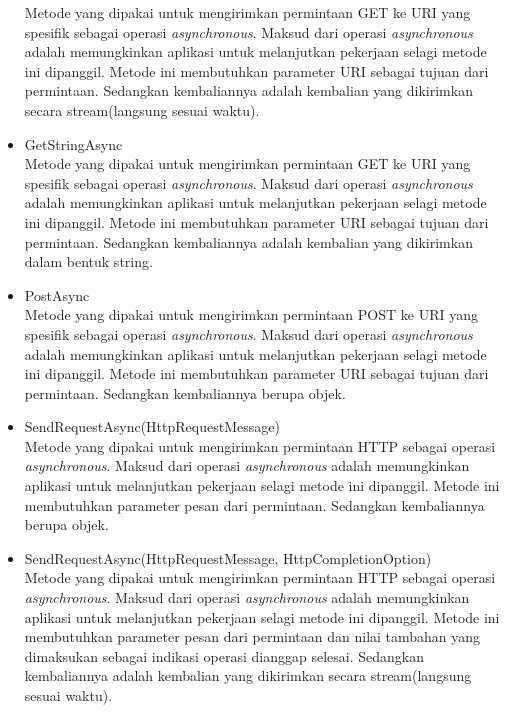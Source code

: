 \begin{itemize}
	Metode yang dipakai untuk mengirimkan permintaan GET ke URI yang spesifik sebagai operasi \textit{asynchronous}. Maksud dari operasi \textit{asynchronous} adalah memungkinkan aplikasi untuk melanjutkan pekerjaan selagi metode ini dipanggil\footnotemark[2]. Metode ini membutuhkan parameter URI sebagai tujuan dari permintaan. Sedangkan kembaliannya adalah kembalian yang dikirimkan secara stream(langsung sesuai waktu).
	\item GetStringAsync \\
	Metode yang dipakai untuk mengirimkan permintaan GET ke URI yang spesifik sebagai operasi \textit{asynchronous}. Maksud dari operasi \textit{asynchronous} adalah memungkinkan aplikasi untuk melanjutkan pekerjaan selagi metode ini dipanggil\footnotemark[2]. Metode ini membutuhkan parameter URI sebagai tujuan dari permintaan. Sedangkan kembaliannya adalah kembalian yang dikirimkan dalam bentuk string.
	\item PostAsync \\
	Metode yang dipakai untuk mengirimkan permintaan POST ke URI yang spesifik sebagai operasi \textit{asynchronous}. Maksud dari operasi \textit{asynchronous} adalah memungkinkan aplikasi untuk melanjutkan pekerjaan selagi metode ini dipanggil\footnotemark[2]. Metode ini membutuhkan parameter URI sebagai tujuan dari permintaan. Sedangkan kembaliannya berupa objek.
	\item SendRequestAsync(HttpRequestMessage) \\
	Metode yang dipakai untuk mengirimkan permintaan HTTP sebagai operasi \textit{asynchronous}. Maksud dari operasi \textit{asynchronous} adalah memungkinkan aplikasi untuk melanjutkan pekerjaan selagi metode ini dipanggil\footnotemark[2]. Metode ini membutuhkan parameter pesan dari permintaan. Sedangkan kembaliannya berupa objek.
	\item SendRequestAsync(HttpRequestMessage, HttpCompletionOption) \\
	Metode yang dipakai untuk mengirimkan permintaan HTTP sebagai operasi \textit{asynchronous}. Maksud dari operasi \textit{asynchronous} adalah memungkinkan aplikasi untuk melanjutkan pekerjaan selagi metode ini dipanggil\footnotemark[2]. Metode ini membutuhkan parameter pesan dari permintaan dan nilai tambahan yang dimaksukan sebagai indikasi operasi dianggap selesai. Sedangkan kembaliannya adalah kembalian yang dikirimkan secara stream(langsung sesuai waktu).
\end{itemize}


